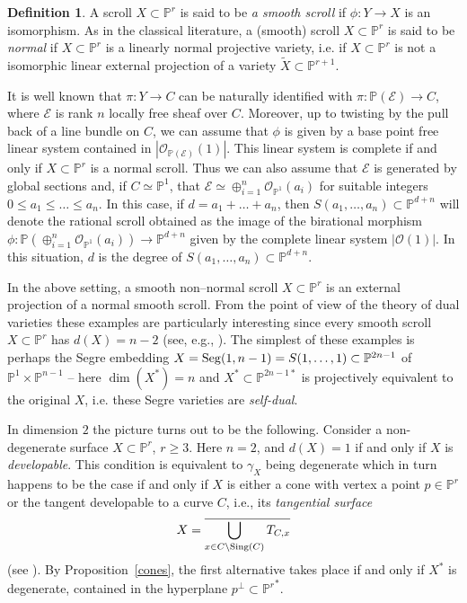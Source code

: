\documentclass[11pt]{article}   %
\theoremstyle{definition}
\newtheorem{Definition}[Theorem]{Definition}
\numberwithin{Theorem}{section} \numberwithin{equation}{section}
\renewcommand{\O}{{\mathcal O}}
\newcommand{\p}{{\mathbb P}}
\begin{document}
{\begin{Definition}
A scroll $X\subset\p^r$ is said to be {\it a smooth scroll} if
$\phi:Y\to X$ is an isomorphism. As in the
classical literature, a (smooth) scroll $X\subset\p^r$ is said to be
{\it normal} if $X\subset\p^r$ is a linearly normal projective
variety, i.e. if $X\subset\p^r$ is not a isomorphic linear external
projection of a
variety $\widetilde X\subset\p^{r+1}$.
\end{Definition}
\medskip

{It is well known that $\pi:Y\to C$ can be naturally identified
with   $\pi:\p(\mathcal E)\to C$, where $\mathcal E$ is rank
$n$ locally free sheaf over $C$. Moreover,  up to twisting by the
pull back of a line bundle on $C$, we can assume that $\phi$ is
given by a base point free linear system contained  in $|\O_{\p(\mathcal
E)}(1)|$. This linear system is complete if and only
if $X\subset\p^r$ is a normal scroll. Thus we can also assume that
$\mathcal E$ is generated by global sections and, if $C\simeq \p^1$,
that $\mathcal E\simeq \oplus_{i=1}^n\O_{\p^1}(a_i)$ for suitable
integers $0\leq a_1\leq\ldots\leq a_n$. In this case, if
$d=a_1+\ldots+a_n$, then $S(a_1,\ldots, a_n)\subset\p^{d+n}$ will
denote the rational scroll obtained as the image of the birational
morphism $\phi:\p( \oplus_{i=1}^n\O_{\p^1}(a_i))\to \p^{d+n}$ given
by the complete linear system $|\O(1)|$.  In this situation,
$d$ is the degree of $S(a_1,\ldots, a_n)\subset\p^{d+n}$.


In the above setting,  a smooth non--normal scroll $X\subset\p^r$ is
an external projection  of a normal smooth scroll. From the point of
view of the theory of dual varieties these examples are particularly
interesting since every smooth scroll $X\subset\p^r$ has $d(X)=n-2$
(see, e.g., \cite{Kleiman}). The simplest of these examples is
perhaps the Segre embedding $X={\rm Seg}(1,n-1)=S(1,\ldots,
1)\subset \p^{2n-1}$ of $\p^1\times \p^{n-1}$ -- here $\dim (X^*)=n$
and $X^*\subset\p^{2n-1*}$ is projectively equivalent to the
original $X$, i.e.  these Segre varieties are \emph {self-dual}.

In dimension $2$ the picture turns out to be the following. Consider a
non-degenerate surface $X\subset \p^ r$, $r\geq 3$. Here
 $n=2$, and  $d(X)=1$ if and only if $X$ is {\it developable}.
This condition  is equivalent to $\gamma_X$
being degenerate which {in turn happens to be} the
case if and only if $X$ is either a cone with vertex a point $p\in
\p^r$ or the tangent developable to a curve $C$, i.e., its
\emph{tangential surface}
$$X=\overline {\bigcup_ {x\in C\setminus{\rm Sing}(C)}T_{C,x}}$$
(see \cite[3.19]{GH}).  By Proposition~\ref{cones}, the first alternative takes place if and
only if $X^ *$ is degenerate, contained in the hyperplane $p^
\perp\subset {\p^r}^*$.

}}
\end{document}
